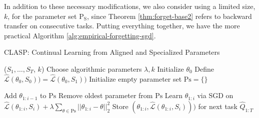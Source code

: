 \documentclass{article}
\theoremstyle{plain}
\theoremstyle{definition}
\theoremstyle{remark}
\begin{document}

In addition to these necessary modifications, we also consider using a limited size, $k$, for the parameter set $\mathrm{P_S}$, since Theorem \ref{thm:forget-base2} refers to backward transfer on consecutive tasks. 
Putting everything together, we have the more practical Algorithm \ref{alg:empirical-forgetting-sgd}. 
%
\begin{algorithm}[H]
	\caption{CLASP: Continual Learning from Aligned and Specialized Parameters}
	\label{alg:empirical-forgetting-sgd}
	\small
	\begin{algorithmic}[1]
		 ($S_1,\ldots, S_T$, $k$)
		\STATE Choose algorithmic parameters $\lambda, k$
            \STATE Initialize $\theta_0$
            \STATE Define $\hat{\mathcal{L}}(\theta_{0}, S_0))=\hat{\mathcal{L}}(\theta_{0}, S_1))$
            \STATE Initialize empty parameter set $\mathrm{Ps}=\{\}$
            
                \STATE Add $\theta_{1:i-1}$ to $\mathrm{Ps}$ 
                    \STATE Remove oldest parameter from $\mathrm{Ps}$
                \ENDIF
            \ENDIF
            \STATE Learn $\theta_{1:i}$ via SGD on $\hat{\mathcal{L}}(\theta_{1:i},S_i)+\lambda\sum_{\theta\in \mathrm{Ps}} ||\theta_{1:i}-\theta||^2_2$
		\STATE Store $(\theta_{1:i}, \hat{\mathcal{L}}(\theta_{1:i}, S_{i})))$ for next task
		\ENDFOR
		 $\hat{Q}_{1:T}$  
	\end{algorithmic}
\end{algorithm}
%
\end{document}
